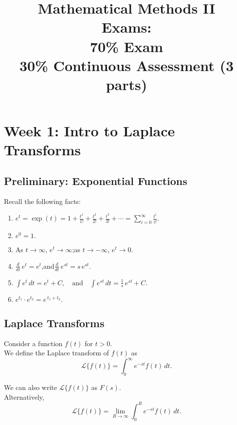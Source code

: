 \documentclass[a4paper]{article}
\title{
Mathematical Methods II\\[2ex]
Exams:\\
70\% Exam\\
30\% Continuous Assessment (3 parts)
}
\author{}
\date{}
\theoremstyle{definition}
\theoremstyle{plain}
\begin{document}
\maketitle
\pagebreak

\tableofcontents
\pagebreak

\section{Week 1: Intro to Laplace Transforms}
\subsection{Preliminary: Exponential Functions}
Recall the following facts:
\begin{enumerate}
    \item \( e^t = \exp(t) = 1 + \frac{t^1}{1!} + \frac{t^2}{2!} + \frac{t^3}{3!} + \cdots 
           = \sum_{i=0}^\infty \frac{t^i}{i!}.\)
    \item \( e^0 = 1.\)
    \item As \( t \to \infty \), \( e^t \to \infty \);\quad as \( t \to -\infty \), \( e^t \to 0.\)
    \item \(\frac{d}{dt}\, e^t = e^t\),\quad and\quad \(\frac{d}{dt}\, e^{st} = s\, e^{st}.\)
    \item \(\displaystyle \int e^t\, dt = e^t + C,\quad \text{and} \quad
           \int e^{st}\, dt = \frac{1}{s}\, e^{st} + C.\)
    \item \( e^{t_1} \cdot e^{t_2} = e^{\,t_1 + t_2}.\)
\end{enumerate}

\subsection{Laplace Transforms}

\begin{definitionbox}
Consider a function \(f(t)\) for \(t > 0\).\\[1ex]
We define the Laplace transform of \(f(t)\) as
\[
\mathcal{L}\{f(t)\} = \int_0^\infty e^{-st} f(t) \, dt.
\]
\end{definitionbox}

\begin{notebox}
We can also write \( \mathcal{L}\{f(t)\} \) as \( F(s) \).\\[1ex]
Alternatively,
\[
\mathcal{L}\{f(t)\} = \lim_{R \to \infty} \int_0^R e^{-st} f(t) \, dt.
\]
\end{notebox}
\end{document}
